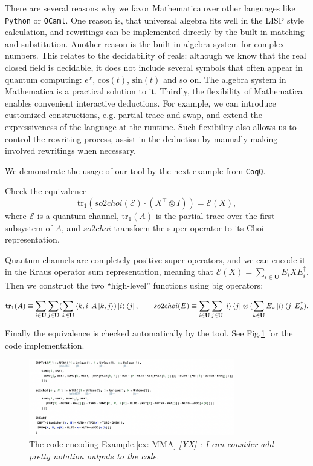 \documentclass[manuscript, review, timestamp]{acmart}
\newcommand{\yx}[1]{\textit{\color{blue}[YX] : #1}}
\begin{document}
There are several reasons why we favor Mathematica over other languages like \texttt{Python} or \texttt{OCaml}.
One reason is, that universal algebra fits well in the LISP style calculation, and rewritings can be implemented directly by the built-in matching and substitution.
Another reason is the built-in algebra system for complex numbers. This relates to the decidability of reals: although we know that the real closed field is decidable, it does not include several symbols that often appear in quantum computing: $e^x$, $\mathrm{cos}(t)$, $\mathrm{sin}(t)$ and so on. The algebra system in Mathematica is a practical solution to it.
Thirdly, the flexibility of Mathematica enables convenient interactive deductions. For example, we can introduce customized constructions, e.g. partial trace and swap, and extend the expressiveness of the language at the runtime. Such flexibility also allows us to control the rewriting process, assist in the deduction by manually making involved rewritings when necessary.

We demonstrate the usage of our tool by the next example from \texttt{CoqQ}.

\begin{example}
  \label{ex: MMA}
Check the equivalence
  \[
    \mathrm{tr}_1(so2choi(\mathcal{E}) \cdot (X^\top \otimes I)) = \mathcal{E}(X),
  \]
where $\mathcal{E}$ is a quantum channel, $\mathrm{tr}_1(A)$ is the partial trace over the first subsystem of $A$, and $so2choi$ transform the super operator to its Choi representation.
\end{example}

Quantum channels are completely positive super operators, and we can encode it in the Kraus operator sum representation, meaning that $\mathcal{E}(X) = \sum_{i \in \mathbf{U}} E_i X E_i^\dagger$. Then we construct the two ``high-level'' functions using big operators:

  \begin{gather*}
    \mathrm{tr}_1(A) \equiv \sum_{i\in\mathbf{U}}\sum_{j\in\mathbf{U}} (\sum_{k\in\mathbf{U}} \bra{k, i} A \ket{k, j}) \ket{i}\bra{j},
    \qquad
    so2choi(E) \equiv \sum_{i\in\mathbf{U}}\sum_{j\in\mathbf{U}} \ket{i}\bra{j} \otimes (\sum_{k\in\mathbf{U}} E_k \ket{i}\bra{j} E_k^\dagger).
  \end{gather*}

  Finally the equivalence is checked automatically by the tool. See Fig.\ref{fig: MMA ex} for the code implementation.

\begin{figure}
  \includegraphics*[width=0.8\textwidth]{MMAexample.png}
  \caption{The code encoding Example.\ref{ex: MMA} \yx{I can consider add pretty notation outputs to the code.}}
  \label{fig: MMA ex}
\end{figure}
\end{document}
